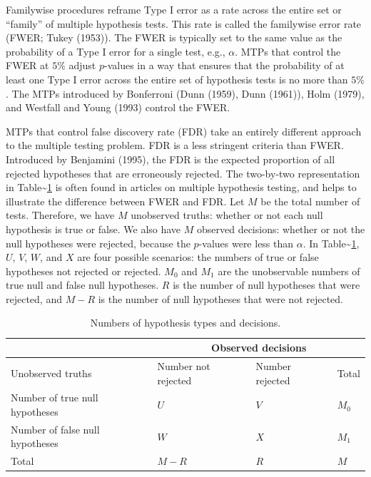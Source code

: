 \documentclass[
]{article}
\begin{document}
Familywise procedures reframe Type I error as a rate across the entire
set or ``family'' of multiple hypothesis tests. This rate is called the
familywise error rate (FWER; Tukey (1953)). The FWER is typically set to
the same value as the probability of a Type I error for a single test,
e.g., \(\alpha\). MTPs that control the FWER at \(5\%\) adjust
\(p\)-values in a way that ensures that the probability of at least one
Type I error across the entire set of hypothesis tests is no more than
\(5\%\). The MTPs introduced by Bonferroni (Dunn (1959), Dunn (1961)),
Holm (1979), and Westfall and Young (1993) control the FWER.

MTPs that control false discovery rate (FDR) take an entirely different
approach to the multiple testing problem. FDR is a less stringent
criteria than FWER. Introduced by Benjamini (1995), the FDR is the
expected proportion of all rejected hypotheses that are erroneously
rejected. The two-by-two representation in
Table\textasciitilde{}\ref{tab:twobytwo} is often found in articles on
multiple hypothesis testing, and helps to illustrate the difference
between FWER and FDR. Let \(M\) be the total number of tests. Therefore,
we have \(M\) unobserved truths: whether or not each null hypothesis is
true or false. We also have \(M\) observed decisions: whether or not the
null hypotheses were rejected, because the \(p\)-values were less than
\(\alpha\). In Table\textasciitilde{}\ref{tab:twobytwo}, \(U\), \(V\),
\(W\), and \(X\) are four possible scenarios: the numbers of true or
false hypotheses not rejected or rejected. \(M_0\) and \(M_1\) are the
unobservable numbers of true null and false null hypotheses. \(R\) is
the number of null hypotheses that were rejected, and \(M - R\) is the
number of null hypotheses that were not rejected.

\begin{table}[h!]
\centering
\begin{tabular}{l l l l}
                                      & \multicolumn{3}{c}{Observed decisions}\\ \hline
Unobserved truths                     & Number not rejected     & Number rejected   & Total \\ \hline
Number of true null hypotheses        & $U$                     & $V$               & $M_0$ \\
Number of false null hypotheses       & $W$                     & $X$               & $M_1$ \\ \hline
Total                                 & $M-R$                   & $R$               & $M$
\end{tabular}
\caption{Numbers of hypothesis types and decisions.}
  \label{tab:twobytwo}
\end{table}
\end{document}
